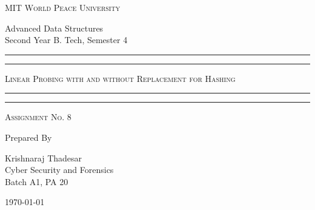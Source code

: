 \documentclass[11pt]{article}
\begin{document}
\begin{titlepage}
    \centering


    \huge\textsc{
        MIT World Peace University
    }\\

    \vspace{0.75\baselineskip} %

    \LARGE{
        Advanced Data Structures\\
        Second Year B. Tech, Semester 4
    }

    \vfill %


    \rule{\textwidth}{1.6pt}\vspace*{-\baselineskip}\vspace*{2pt}
    \rule{\textwidth}{0.6pt}
    \vspace{0.75\baselineskip} %



    \huge{\textsc{
            Linear Probing with and without Replacement for Hashing
        }} \\



    \vspace{0.5\baselineskip} %
    \rule{\textwidth}{0.6pt}\vspace*{-\baselineskip}\vspace*{2.8pt}
    \rule{\textwidth}{1.6pt}

    \vspace{1\baselineskip} %


    \LARGE\textsc{
        Assignment No. 8
    } %
    \vfill


    Prepared By
    \vspace{0.5\baselineskip} %

    \Large{
        Krishnaraj Thadesar \\
        Cyber Security and Forensics\\
        Batch A1, PA 20
    }


    \vspace{0.5\baselineskip} %
    \today

\end{titlepage}
\end{document}
